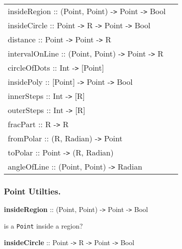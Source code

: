  
\begin{tabular}{p{0.95\linewidth}}{insideRegion :: (Point, Point) -{\tt >} Point -{\tt >} Bool}\\ %


{insideCircle :: Point -{\tt >} R -{\tt >} Point -{\tt >} Bool}\\ %


{distance :: Point -{\tt >} Point -{\tt >} R}\\ %


{intervalOnLine :: (Point, Point) -{\tt >} Point -{\tt >} R}\\ %


{circleOfDots :: Int -{\tt >} [Point]}\\ %


{insidePoly :: [Point] -{\tt >} Point -{\tt >} Bool}\\ %


{innerSteps :: Int -{\tt >} [R]}\\ %


{outerSteps :: Int -{\tt >} [R]}\\ %


{fracPart :: R -{\tt >} R}\\ %


{fromPolar :: (R, Radian) -{\tt >} Point}\\ %


{toPolar :: Point -{\tt >} (R, Radian)}\\ %


{angleOfLine :: (Point, Point) -{\tt >} Radian}\\ %


\end{tabular}


 

 

\subsubsection{Point Utilties.}

 

{{\bf insideRegion} :: (Point, Point) -{\tt >} Point -{\tt >} Bool}

\hspace{0.05\textwidth}\begin{minipage}{0.9\textwidth}is a {\tt Point} inside a region?\end{minipage}

 

{{\bf insideCircle} :: Point -{\tt >} R -{\tt >} Point -{\tt >} Bool}

